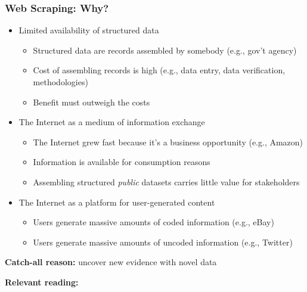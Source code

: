 \documentclass[10pt, aspectratio=1610, natbib, handout]{beamer}
\begin{document}
  \begin{frame}
    \frametitle{Web Scraping: Why?}

    \begin{itemize}
      \item Limited availability of structured data
        \begin{itemize}
          \item Structured data are records assembled by somebody (e.g., gov't agency)
          \item Cost of assembling records is high (e.g., data entry, data verification, methodologies)
          \item Benefit must outweigh the costs
        \end{itemize}

      \vfill\pause

      \item The Internet as a medium of information exchange
        \begin{itemize}
          \item The Internet grew fast because it's a business opportunity (e.g., Amazon)
          \item Information is available for consumption reasons
          \item Assembling structured \textit{public} datasets carries little value for stakeholders
        \end{itemize}

      \vfill\pause

      \item The Internet as a platform for user-generated content
        \begin{itemize}
          \item Users generate massive amounts of coded information (e.g., eBay)
          \item Users generate massive amounts of uncoded information (e.g., Twitter)
        \end{itemize}
    \end{itemize}

    \vfill\pause

    \textbf{Catch-all reason:} uncover new evidence with novel data

    \textbf{Relevant reading:} \cite{Edelman2012}

  \end{frame}
\end{document}
